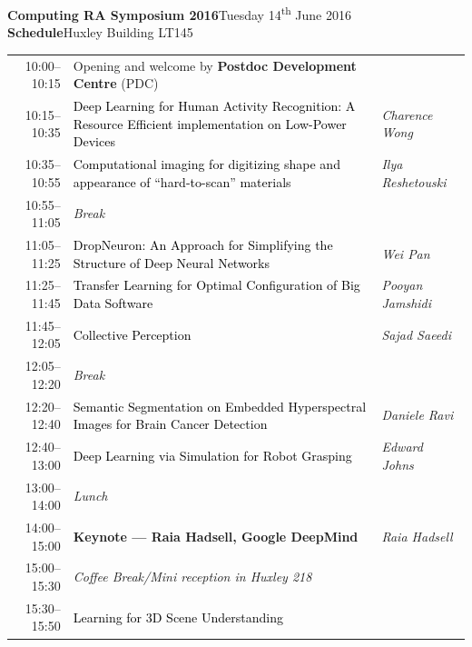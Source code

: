 \documentclass[11pt]{article}
\newcommand{\schetalk}[1]{\noindent\textcolor{black}{#1}}
\newcommand{\schespeaker}[1]{\textit{#1}}
\begin{document}
\textbf{\flushleft\Huge Computing RA Symposium 2016}\hfill{}Tuesday 14\textsuperscript{th} June 2016\\
\textbf{\flushleft\LARGE\color{icdarkblue}Schedule}\hfill{}Huxley Building LT145\\[0.5cm]

\renewcommand{\arraystretch}{1.2}
\begin{tabular}{r@{\quad\color{icdarkblue}{\vline}\quad}p{10cm}@{\quad\color{iclightblue}{\vline}\quad}l}
  10:00--10:15
  & Opening and welcome by \textbf{Postdoc Development Centre} (PDC)
  & \\
  10:15--10:35
  & \schetalk{Deep Learning for Human Activity Recognition: A Resource Efficient implementation on Low-Power Devices}
  & \schespeaker{Charence Wong}
  \\
  10:35--10:55
  & \schetalk{Computational imaging for digitizing shape and appearance of ``hard-to-scan'' materials}
  & \schespeaker{Ilya Reshetouski}
  \\[0.8cm]
  \textcolor{nontalk}{10:55--11:05}
  & \textit{\color{nontalk}Break}
  & \\[0.3cm]
  11:05--11:25
  & \schetalk{DropNeuron: An Approach for Simplifying the Structure of Deep Neural Networks}
  & \schespeaker{Wei Pan}\\
  11:25--11:45
  & \schetalk{Transfer Learning for Optimal Configuration of Big Data Software}
  & \schespeaker{Pooyan Jamshidi}\\
  11:45--12:05
  & \schetalk{Collective Perception}
  & \schespeaker{Sajad Saeedi}\\[0.3cm]
  \textcolor{nontalk}{12:05--12:20}
  & \textit{\color{nontalk}Break}
  & \\[0.3cm]
  12:20--12:40
  & \schetalk{Semantic Segmentation on Embedded Hyperspectral Images for Brain Cancer Detection}
  & \schespeaker{Daniele Ravi}\\
  12:40--13:00
  & \schetalk{Deep Learning via Simulation for Robot Grasping}
  & \schespeaker{Edward Johns}\\[0.3cm]
  \textcolor{nontalk}{13:00--14:00}
  & \textit{\color{nontalk}Lunch}
  & \\[0.3cm]
  14:00--15:00
  & {\large\bf Keynote --- Raia Hadsell, Google DeepMind}
  & \textit{Raia Hadsell}\\
  \textcolor{nontalk}{15:00--15:30}
  & \textit{\color{nontalk}Coffee Break/Mini reception in Huxley 218}
  & \\[0.3cm]
  15:30--15:50
  & \schetalk{Learning for 3D Scene Understanding}

\end{tabular}
\end{document}
